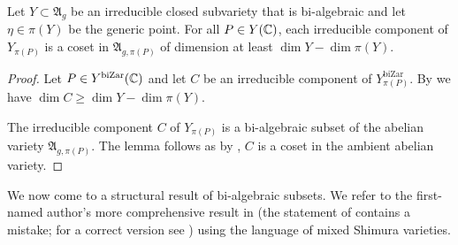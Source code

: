 \documentclass[12pt,oneside]{amsart}
\newcommand{\philipp}[1]{{\color{blue} Philipp: #1}}
\newcommand{\ziyang}[1]{{\color{red} Ziyang: #1}}
\begin{document}
\begin{lemma}
  \label{lem:YbiZarfiber}
  Let $Y\subset \mathfrak{A}_{g}$
  be an irreducible closed
  subvariety that is bi-algebraic and
  let $\eta\in \pi(Y)$ be the  generic point.
  For all $P\in Y({\mathbb{C}})$, each irreducible component of 
  $Y_{\pi(P)}$ is a coset in
  $\mathfrak{A}_{g,\pi(P)}$ of
  dimension at least $\dim Y - \dim \pi(Y)$.
\end{lemma}
\begin{proof}   
  Let $P\in Y^{\mathrm{biZar}}({\mathbb{C}})$ and let  $C$ be an irreducible component of
  $Y^{\mathrm{biZar}}_{\pi(P)}$.  By \cite[Corollary 14.116
  and Remark 14.117]{GoertzWedhorn} we have
  $\dim C \ge \dim Y - \dim \pi(Y)$.

  The irreducible component $C$ of $Y_{\pi(P)}$ is a bi-algebraic
  subset of the abelian variety $\mathfrak{A}_{g,\pi(P)}$. The lemma
  follows as by
  \cite[Proposition~5.1]{UYweaklyspecial}, $C$ is a coset in the ambient
  abelian variety.
\end{proof}

We now come to a structural  result of bi-algebraic subsets. We refer
to the first-named author's more comprehensive result in \cite{Gao:SNS17} (the statement of \cite[Proposition~3.3]{Gao:SNS17} contains a mistake; for a correct version see \cite[Proposition~5.3]{GaoBettiRank}) using the language of mixed Shimura varieties.
\end{document}
